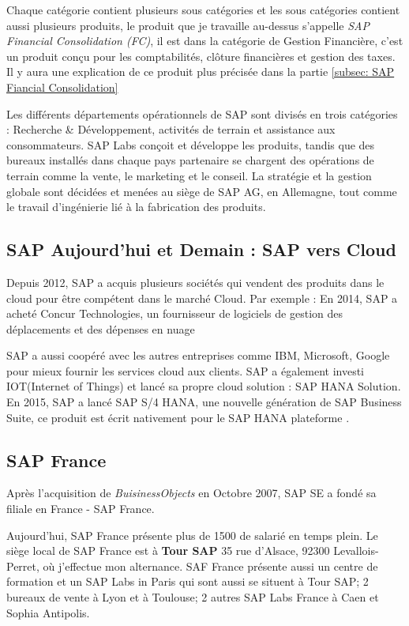 Chaque catégorie contient plusieurs sous catégories et les sous catégories contient aussi plusieurs produits, le produit que je travaille au-dessus s'appelle \textit{SAP Financial Consolidation (FC)}, il est dans la catégorie de Gestion Financière, c'est un produit conçu pour les comptabilités, clôture financières et gestion des taxes. Il y aura une explication de ce produit plus précisée dans la partie \ref{subsec: SAP Fiancial Consolidation}


Les différents départements opérationnels de SAP sont divisés en trois catégories : Recherche \& Développement, activités de terrain et assistance aux consommateurs. SAP Labs conçoit et développe les produits, tandis que des bureaux installés dans chaque pays partenaire se chargent des opérations de terrain comme la vente, le marketing et le conseil. La stratégie et la gestion globale sont décidées et menées au siège de SAP AG, en Allemagne, tout comme le travail d’ingénierie lié à la fabrication des produits.

\subsection{SAP Aujourd'hui et Demain : SAP vers Cloud}
Depuis 2012, SAP a acquis plusieurs sociétés qui vendent des produits dans le cloud pour être compétent dans le marché Cloud. Par exemple : En 2014, SAP a acheté Concur Technologies, un fournisseur de logiciels de gestion des déplacements et des dépenses en nuage

\par SAP a aussi coopéré avec les autres entreprises comme IBM, Microsoft, Google pour mieux fournir les services cloud aux clients. SAP a également investi IOT(Internet of Things) et lancé sa propre cloud solution : SAP HANA Solution. En 2015, SAP a lancé SAP S/4 HANA, une nouvelle génération de SAP Business Suite, ce produit est écrit nativement pour le SAP HANA plateforme .

\subsection{SAP France}
    Après l'acquisition de \textit{BuisinessObjects} en Octobre 2007, SAP SE a fondé sa filiale en France - SAP France. 
    \par Aujourd'hui, SAP France présente plus de 1500 de salarié en temps plein. Le siège local de SAP France est à \textbf{Tour SAP} 35 rue d'Alsace, 92300 Levallois-Perret, où j'effectue mon alternance. SAF France présente aussi un centre de formation et un SAP Labs in Paris qui sont aussi se situent à Tour SAP; 2 bureaux de vente à Lyon et à Toulouse; 2 autres SAP Labs France à Caen et Sophia Antipolis.
    
